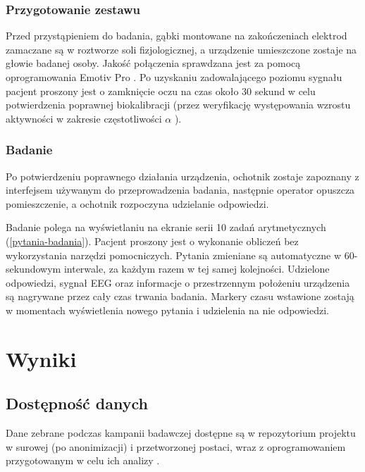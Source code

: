 \documentclass{./assets/wfis}
\begin{document}
\subsection{Przygotowanie zestawu}
Przed przystąpieniem do badania, gąbki montowane na zakończeniach elektrod zamaczane są w roztworze soli fizjologicznej, a urządzenie umieszczone zostaje na głowie badanej osoby. Jakość połączenia sprawdzana jest za pomocą oprogramowania Emotiv Pro \cite{emotiv_inc_epoc_nodate}. Po uzyskaniu zadowalającego poziomu sygnału pacjent proszony jest o zamknięcie oczu na czas około 30 sekund w celu potwierdzenia poprawnej biokalibracji (przez weryfikację występowania wzrostu aktywności w zakresie częstotliwości $\alpha$ \cite{britton_electroencephalography_2016}).

\subsection{Badanie}
Po potwierdzeniu poprawnego działania urządzenia, ochotnik zostaje zapoznany z interfejsem używanym do przeprowadzenia badania, następnie operator opuszcza pomieszczenie, a ochotnik rozpoczyna udzielanie odpowiedzi.

Badanie polega na wyświetlaniu na ekranie  serii 10 zadań arytmetycznych (\autoref{pytania-badania}). Pacjent proszony jest o wykonanie obliczeń bez wykorzystania narzędzi pomocniczych. Pytania zmieniane są automatyczne w 60-sekundowym interwale, za każdym razem w tej samej kolejności. Udzielone odpowiedzi, sygnał EEG oraz informacje o przestrzennym położeniu urządzenia są nagrywane przez cały czas trwania badania. Markery czasu wstawione zostają w momentach wyświetlenia nowego pytania i udzielenia na nie odpowiedzi.


\chapter{Wyniki}
\section{Dostępność danych}
Dane zebrane podczas kampanii badawczej dostępne są w repozytorium projektu w surowej (po anonimizacji) i przetworzonej postaci, wraz z oprogramowaniem przygotowanym w celu ich analizy  \cite{mateusz_kojro_mateuszkojrobachelors-thesis_nodate}. 
\end{document}
